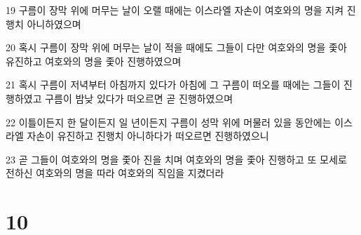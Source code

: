 \par 19 구름이 장막 위에 머무는 날이 오랠 때에는 이스라엘 자손이 여호와의 명을 지켜 진행치 아니하였으며
\par 20 혹시 구름이 장막 위에 머무는 날이 적을 때에도 그들이 다만 여호와의 명을 좇아 유진하고 여호와의 명을 좇아 진행하였으며
\par 21 혹시 구름이 저녁부터 아침까지 있다가 아침에 그 구름이 떠오를 때에는 그들이 진행하였고 구름이 밤낮 있다가 떠오르면 곧 진행하였으며
\par 22 이틀이든지 한 달이든지 일 년이든지 구름이 성막 위에 머물러 있을 동안에는 이스라엘 자손이 유진하고 진행치 아니하다가 떠오르면 진행하였으니
\par 23 곧 그들이 여호와의 명을 좇아 진을 치며 여호와의 명을 좇아 진행하고 또 모세로 전하신 여호와의 명을 따라 여호와의 직임을 지켰더라

\chapter{10}

